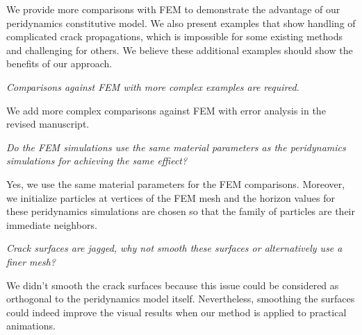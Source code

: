 We provide more comparisons with FEM to demonstrate the advantage of our peridynamics constitutive model. We also present examples that show handling of complicated crack propagations, which is impossible for some existing methods and challenging for others. We believe these additional examples should show the benefits of our approach.

\emph{Comparisons against FEM with more complex examples are required.}

We add more complex comparisons against FEM with error analysis in the revised manuscript.

\emph{Do the FEM simulations use the same material parameters as the peridynamics simulations for achieving the same effiect?}

Yes, we use the same material parameters for the FEM comparisons. Moreover, we initialize particles at vertices of the FEM mesh and the horizon values for these peridynamics simulations are chosen so that the family of particles are their immediate neighbors.

\emph{Crack surfaces are jagged, why not smooth these surfaces or alternatively use a finer mesh?}

We didn't smooth the crack surfaces because this issue could be considered as orthogonal to the peridynamics model itself. Nevertheless, smoothing the surfaces could indeed improve the visual results when our method is applied to practical animations.



%





